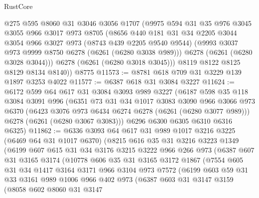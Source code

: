 \begin{lexlean}{RustCore}
\begin{coremodule}
        @275
        @595
        @8060
        @31
        @3046
        @3056
        @1707
        (@9975
          @594
          @31
          @35
          @976
          @3045
          @3055
          @966
          @3017
          @973
          @8705
          (@8656
            @440
            @181
            @31
            @34
            @2205
            @3044
            @3054
            @966
            @3027
            @973
            (@8743 @439 @2205 @9540 @9544)
            (@9993 @3037 @973 @9999 @8750 @6278 (@6261 (@6280 @3038 @989)))
            @6278
            (@6261 (@6280 @3028 @3044)))
          @6278
          (@6261 (@6280 @3018 @3045)))
        @8119
        @8122
        @8125
        @8129
        @8134
        @8140))
    @8775
@11573 := @8781 @618 @709 @31 @3229 @139 @1897 @3253 @4022
@11577 := @6387 @618 @31 @3084 @3227
@11624 := @6172
    @599
    @64
    @617
    @31
    @3084
    @3093
    @989
    @3227
    (@6187
      @598
      @35
      @118
      @3084
      @3091
      @996
      (@6351
        @73
        @31
        @34
        @1017
        @3083
        @3090
        @966
        @3066
        @973
        @6370
        (@6423 @3076 @973 @6434 @6274 @6278 (@6261 (@6280 @3077 @989)))
        @6278
        (@6261 (@6280 @3067 @3083)))
      @6296
      @6300
      @6305
      @6310
      @6316
      @6325)
@11862 := @6336
    @3093
    @64
    @617
    @31
    @989
    @1017
    @3216
    @3225
    (@6469 @64 @31 @1017 @6370)
    (@8215
      @616
      @35
      @31
      @3216
      @3223
      @1349
      (@6199
        @607
        @615
        @31
        @34
        @3176
        @3215
        @3222
        @966
        @266
        @973
        (@6387
          @607
          @31
          @3165
          @3174
          (@10778
            @606
            @35
            @31
            @3165
            @3172
            @1867
            (@7554
              @605
              @31
              @34
              @1417
              @3164
              @3171
              @966
              @3104
              @973
              @7572
              (@6199
                @603
                @59
                @31
                @33
                @3161
                @989
                @1006
                @966
                @402
                @973
                (@6387
                  @603
                  @31
                  @3147
                  @3159
                  (@8058
                    @602
                    @8060
                    @31
                    @3147

\end{coremodule}
\end{lexlean}
